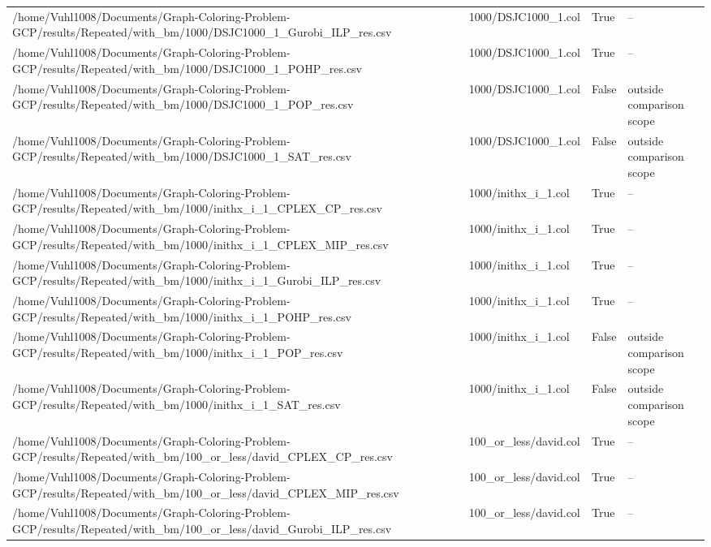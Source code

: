 \begin{table}[htbp]
\begin{tabular}{llll}
/home/Vuhl1008/Documents/Graph-Coloring-Problem-GCP/results/Repeated/with\_bm/1000/DSJC1000\_1\_Gurobi\_ILP\_res.csv & 1000/DSJC1000\_1.col & True & -- \\
/home/Vuhl1008/Documents/Graph-Coloring-Problem-GCP/results/Repeated/with\_bm/1000/DSJC1000\_1\_POHP\_res.csv & 1000/DSJC1000\_1.col & True & -- \\
/home/Vuhl1008/Documents/Graph-Coloring-Problem-GCP/results/Repeated/with\_bm/1000/DSJC1000\_1\_POP\_res.csv & 1000/DSJC1000\_1.col & False & outside comparison scope \\
/home/Vuhl1008/Documents/Graph-Coloring-Problem-GCP/results/Repeated/with\_bm/1000/DSJC1000\_1\_SAT\_res.csv & 1000/DSJC1000\_1.col & False & outside comparison scope \\
/home/Vuhl1008/Documents/Graph-Coloring-Problem-GCP/results/Repeated/with\_bm/1000/inithx\_i\_1\_CPLEX\_CP\_res.csv & 1000/inithx\_i\_1.col & True & -- \\
/home/Vuhl1008/Documents/Graph-Coloring-Problem-GCP/results/Repeated/with\_bm/1000/inithx\_i\_1\_CPLEX\_MIP\_res.csv & 1000/inithx\_i\_1.col & True & -- \\
/home/Vuhl1008/Documents/Graph-Coloring-Problem-GCP/results/Repeated/with\_bm/1000/inithx\_i\_1\_Gurobi\_ILP\_res.csv & 1000/inithx\_i\_1.col & True & -- \\
/home/Vuhl1008/Documents/Graph-Coloring-Problem-GCP/results/Repeated/with\_bm/1000/inithx\_i\_1\_POHP\_res.csv & 1000/inithx\_i\_1.col & True & -- \\
/home/Vuhl1008/Documents/Graph-Coloring-Problem-GCP/results/Repeated/with\_bm/1000/inithx\_i\_1\_POP\_res.csv & 1000/inithx\_i\_1.col & False & outside comparison scope \\
/home/Vuhl1008/Documents/Graph-Coloring-Problem-GCP/results/Repeated/with\_bm/1000/inithx\_i\_1\_SAT\_res.csv & 1000/inithx\_i\_1.col & False & outside comparison scope \\
/home/Vuhl1008/Documents/Graph-Coloring-Problem-GCP/results/Repeated/with\_bm/100\_or\_less/david\_CPLEX\_CP\_res.csv & 100\_or\_less/david.col & True & -- \\
/home/Vuhl1008/Documents/Graph-Coloring-Problem-GCP/results/Repeated/with\_bm/100\_or\_less/david\_CPLEX\_MIP\_res.csv & 100\_or\_less/david.col & True & -- \\
/home/Vuhl1008/Documents/Graph-Coloring-Problem-GCP/results/Repeated/with\_bm/100\_or\_less/david\_Gurobi\_ILP\_res.csv & 100\_or\_less/david.col & True & -- \\

\end{tabular}
\end{table}
